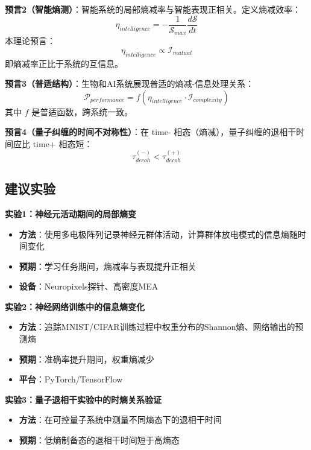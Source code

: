\documentclass[12pt,a4paper]{article}
\begin{document}
\textbf{预言2（智能熵测）}：智能系统的局部熵减率与智能表现正相关。定义熵减效率：
\begin{equation}
\eta_{intelligence} = -\frac{1}{\mathcal{S}_{max}} \frac{d\mathcal{S}}{dt}
\end{equation}
本理论预言：
\begin{equation}
\eta_{intelligence} \propto \mathcal{I}_{mutual}
\end{equation}
即熵减率正比于系统的互信息。

\textbf{预言3（普适结构）}：生物和AI系统展现普适的熵减-信息处理关系：
\begin{equation}
\mathcal{P}_{performance} = f(\eta_{intelligence} \cdot \mathcal{I}_{complexity})
\end{equation}
其中 $f$ 是普适函数，跨系统一致。

\textbf{预言4（量子纠缠的时间不对称性）}：在 time- 相态（熵减），量子纠缠的退相干时间应比 time+ 相态短：
\begin{equation}
\tau_{decoh}^{(-)} < \tau_{decoh}^{(+)}
\end{equation}

\subsection{建议实验}

\textbf{实验1：神经元活动期间的局部熵变}
\begin{itemize}
\item \textbf{方法}：使用多电极阵列记录神经元群体活动，计算群体放电模式的信息熵随时间变化
\item \textbf{预期}：学习任务期间，熵减率与表现提升正相关
\item \textbf{设备}：Neuropixels探针、高密度MEA
\end{itemize}

\textbf{实验2：神经网络训练中的信息熵变化}
\begin{itemize}
\item \textbf{方法}：追踪MNIST/CIFAR训练过程中权重分布的Shannon熵、网络输出的预测熵
\item \textbf{预期}：准确率提升期间，权重熵减少
\item \textbf{平台}：PyTorch/TensorFlow
\end{itemize}

\textbf{实验3：量子退相干实验中的时熵关系验证}
\begin{itemize}
\item \textbf{方法}：在可控量子系统中测量不同熵态下的退相干时间
\item \textbf{预期}：低熵制备态的退相干时间短于高熵态
\end{itemize}
\end{document}
